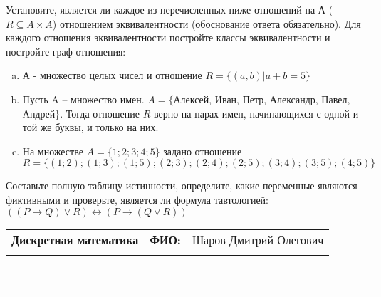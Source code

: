 \documentclass[10pt]{exam}
\newcommand{\class}{Дискретная математика}
\newcommand{\examdate}{}
\begin{document}
\begin{questions}
\question
Установите, является ли каждое из перечисленных ниже отношений на А ($R \subseteq A \times A$) отношением эквивалентности (обоснование ответа обязательно). Для каждого отношения эквивалентности постройте классы 
эквивалентности и постройте граф отношения:
\begin{enumerate} [a)]\setcounter{enumi}{0}
\item А - множество целых чисел и отношение $R = \{(a,b)|a + b = 5\}$
\item Пусть A – множество имен. $A = \{ $Алексей, Иван, Петр, Александр, Павел, Андрей$ \}$. Тогда отношение $R $ верно на парах имен, начинающихся с одной и той же буквы, и только на них.
\item На множестве $A = \{1; 2; 3; 4; 5\}$ задано отношение $R = \{(1; 2); (1; 3); (1; 5); (2; 3); (2; 4); (2; 5); (3; 4); (3; 5); (4; 5)\}$
\end{enumerate}\question Составьте полную таблицу истинности, определите, какие переменные являются фиктивными и проверьте, является ли формула тавтологией:
$((P \rightarrow Q) \lor R) \leftrightarrow (P \rightarrow (Q \lor R))$

\end{questions}
\newpage
\begin{flushright}
\begin{tabular}{p{2.8in} r l}
\textbf{\class} & \textbf{ФИО:} &Шаров Дмитрий Олегович
\\

\textbf{\examdate} &&\\
\end{tabular}\\
\end{flushright}
\rule[1ex]{\textwidth}{.1pt}
\end{document}
